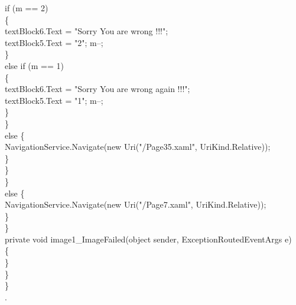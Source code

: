 {{                        if (m == 2)\\
                        \{\\
                            textBlock6.Text = "Sorry You are wrong !!!";\\
                            textBlock5.Text = "2"; m--;\\
                        \}\\
                        else if (m == 1)\\
                        \{\\
                            textBlock6.Text = "Sorry You are wrong again !!!";\\
                            textBlock5.Text = "1"; m--;\\
                        \}\\
                    \}\\
                    else
                    \{\\
                        NavigationService.Navigate(new Uri("/Page35.xaml", UriKind.Relative));\\
                    \}\\
                \}\\
            \}\\

            else
            \{\\
                NavigationService.Navigate(new Uri("/Page7.xaml", UriKind.Relative));\\
            \}\\
        \}\\


        private void image1_ImageFailed(object sender, ExceptionRoutedEventArgs e)\\
        \{\\

        \}\\
    \}\\
\}\\

\cite{DBLP:journals/ivc/KadyrovP03}.\\
\rmfamily



}}
